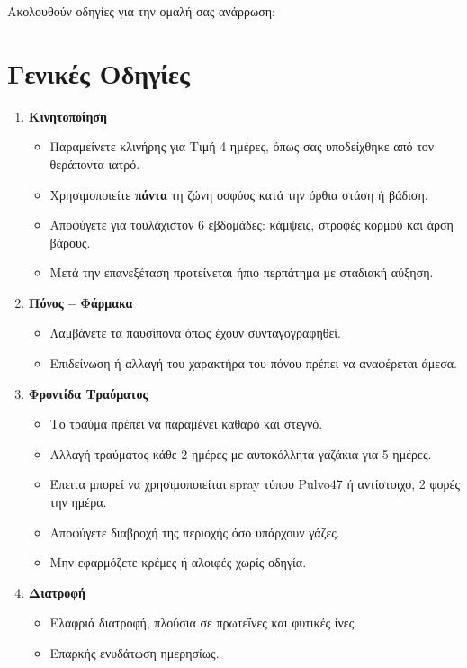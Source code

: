 \documentclass[10pt,greek]{article}
\begin{document}
\begin{PatientInfo}
\end{PatientInfo}

Ακολουθούν οδηγίες για την ομαλή σας ανάρρωση:

\section*{Γενικές Οδηγίες}
\begin{enumerate}[label=\arabic*.]
\setlength{\parskip}{6pt}
  \item \textbf{Κινητοποίηση}
       \begin{itemize}
\item Παραμείνετε κλινήρης για Τιμή 4 ημέρες, όπως σας υποδείχθηκε από τον θεράποντα ιατρό.
\item Χρησιμοποιείτε \textbf{πάντα} τη ζώνη οσφύος κατά την όρθια στάση ή βάδιση.
\item Αποφύγετε για τουλάχιστον 6 εβδομάδες: κάμψεις, στροφές κορμού και άρση βάρους.
\item Μετά την επανεξέταση προτείνεται ήπιο περπάτημα με σταδιακή αύξηση.
    \end{itemize}
  \item \textbf{Πόνος -- Φάρμακα}
      \begin{itemize}
\item Λαμβάνετε τα παυσίπονα όπως έχουν συνταγογραφηθεί.
\item Επιδείνωση ή αλλαγή του χαρακτήρα του πόνου πρέπει να αναφέρεται άμεσα.
    \end{itemize}
  \item \textbf{Φροντίδα Τραύματος}
      \begin{itemize}
\item Το τραύμα πρέπει να παραμένει καθαρό και στεγνό.
\item Αλλαγή τραύματος κάθε 2 ημέρες με αυτοκόλλητα γαζάκια για 5 ημέρες.
\item Έπειτα μπορεί να χρησιμοποιείται spray τύπου Pulvo47 ή αντίστοιχο, 2 φορές την ημέρα.
\item Αποφύγετε διαβροχή της περιοχής όσο υπάρχουν γάζες.
\item Μην εφαρμόζετε κρέμες ή αλοιφές χωρίς οδηγία.
    \end{itemize}
  \item \textbf{Διατροφή}
    \begin{itemize}
\item Ελαφριά διατροφή, πλούσια σε πρωτεΐνες και φυτικές ίνες.
\item Επαρκής ενυδάτωση ημερησίως.
    \end{itemize}
\end{enumerate}
\end{document}
